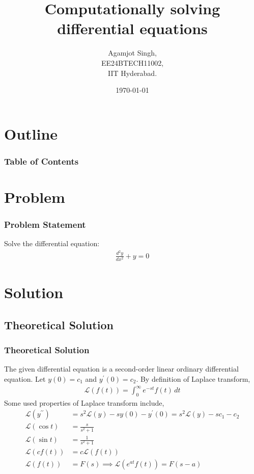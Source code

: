 \documentclass{beamer}
\title{Computationally solving differential equations \brak{\text{9.1.3}}}
\author{Agamjot Singh,\\EE24BTECH11002,\\IIT Hyderabad.}
\date{\today}
\providecommand{\brak}[1]{\ensuremath{\left(#1\right)}}
\theoremstyle{remark}
\numberwithin{equation}{section}
\begin{document}
\begin{frame}
\titlepage
\end{frame}

\section*{Outline}
\begin{frame}
\frametitle{Table of Contents}
\tableofcontents
\end{frame}

\section{Problem}

\begin{frame}
\frametitle{Problem Statement}
Solve the differential equation:
\begin{align}
    \frac{d^2 y}{d x^2} + y = 0
\end{align}
\end{frame}

\section{Solution}

\subsection{Theoretical Solution}
\begin{frame}
\frametitle{Theoretical Solution}
The given differential equation is a second-order linear ordinary differential equation. \newline
Let $y\brak{0} = c_1$ and $y^{\prime}\brak{0} = c_2$.
By definition of Laplace transform,
\begin{align}
    \mathcal{L}\brak{f\brak{t}} = \int_0^{\infty} e^{-st} f\brak{t} \, dt
\end{align}
Some used properties of Laplace transform include,
\begin{align}
    \mathcal{L}\brak{y^{\prime\prime}} &= s^2\mathcal{L}\brak{y} -sy\brak{0}-y^\prime\brak{0} = s^2\mathcal{L}\brak{y} -sc_1 - c_2\\
    \mathcal{L}\brak{\cos{t}} &= \frac{s}{s^2 + 1}\\
    \mathcal{L}\brak{\sin{t}} &= \frac{1}{s^2 + 1}\\
    \mathcal{L}\brak{cf\brak{t}} &= c\mathcal{L}\brak{f\brak{t}}\\
    \mathcal{L}\brak{f\brak{t}} &= F\brak{s} \implies \mathcal{L}\brak{e^{at}f\brak{t}} = F\brak{s-a}
\end{align}
\end{frame}
\end{document}
